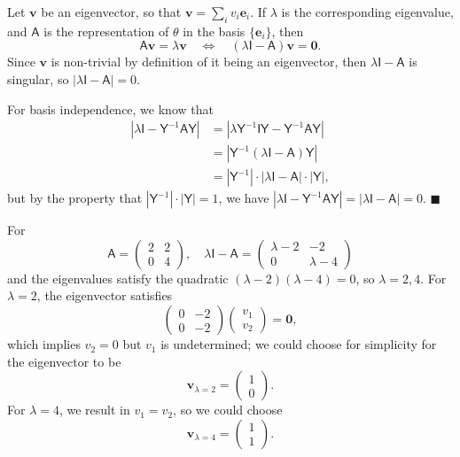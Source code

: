 \documentclass[letter-paper]{tufte-book}
\newenvironment{proof}[1][Proof]{\begin{trivlist}
\item[\hskip \labelsep {\bfseries #1}]}{\end{trivlist}}
\newenvironment{example}[1][Example]{\begin{trivlist}
\item[\hskip \labelsep {\bfseries #1}]}{\end{trivlist}}
\newcommand{\As}{{\mathsf{A}}}
\newcommand{\Is}{{\mathsf{I}}}
\newcommand{\Ys}{{\mathsf{Y}}}
\newcommand{\Ob}{{\boldsymbol{0}}}
\newcommand{\eb}{{\boldsymbol{e}}}
\newcommand{\vb}{{\boldsymbol{v}}}
\newcommand{\qed}{\hfill$\blacksquare$}
\begin{document}
\begin{proof}
  Let $\vb$ be an eigenvector, so that $\vb=\sum_i v_i\eb_i$. If $\lambda$ is
  the corresponding eigenvalue, and $\textsf{A}$ is the representation of
  $\theta$ in the basis $\{\eb_i\}$, then
  \begin{equation*}
    \As\vb = \lambda\vb \quad \Leftrightarrow \quad (\lambda\Is - \As)\vb = \Ob.
  \end{equation*}
  Since $\vb$ is non-trivial by definition of it being an eigenvector, then
  $\lambda\Is - \As$ is singular, so $|\lambda\Is - \As| = 0$.
  
  For basis independence, we know that
  \begin{align*}
    |\lambda\Is - \Ys^{-1}\As\Ys| &= |\lambda\Ys^{-1}\Is\Ys - \Ys^{-1}\As\Ys| \\
      & = |\Ys^{-1}(\lambda\Is- \As)\Ys|\\
      & = |\Ys^{-1}| \cdot |\lambda\Is- \As| \cdot |\Ys|,
  \end{align*}
  but by the property that $|\Ys^{-1}| \cdot |\Ys| = 1$, we have $|\lambda\Is -
  \Ys^{-1}\As\Ys| = |\lambda\Is- \As| = 0$. \qed
\end{proof}

\begin{example}
  For
  \begin{equation*}
    \As = \begin{pmatrix}2 & 2 \\ 0 & 4\end{pmatrix}, \quad \lambda\Is - \As = \begin{pmatrix}\lambda - 2 & -2 \\ 0 & \lambda - 4\end{pmatrix}
  \end{equation*}
  and the eigenvalues satisfy the quadratic
  $(\lambda-2)(\lambda-4) = 0$, so $\lambda=2, 4$. For $\lambda=2$, the
  eigenvector satisfies
  \begin{equation*}
    \begin{pmatrix}0 & -2 \\ 0 & -2\end{pmatrix}\begin{pmatrix}v_1 \\ v_2 \end{pmatrix} = \Ob,
  \end{equation*}
  which implies $v_2 = 0$ but $v_1$ is undetermined; we could choose for
  simplicity for the eigenvector to be
  \begin{equation*}
   \vb_{\lambda=2} = \begin{pmatrix}1 \\ 0 \end{pmatrix}.
  \end{equation*}
  For $\lambda = 4$, we result in $v_1 = v_2$, so we could choose
  \begin{equation*}
   \vb_{\lambda=4} = \begin{pmatrix}1 \\ 1 \end{pmatrix}.
  \end{equation*}
\end{example}
\end{document}
